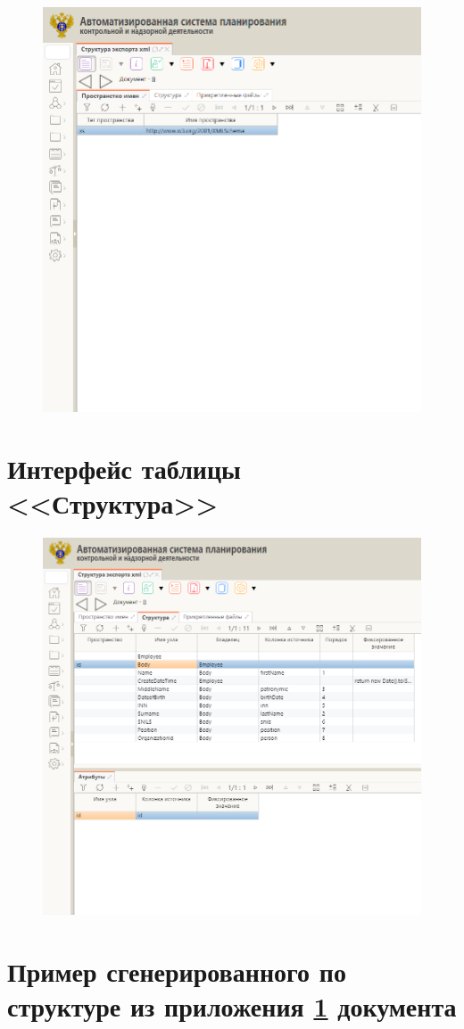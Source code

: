 \documentclass[a4paper,12pt]{diplom}
\begin{document}
\begin{figure}[!ht]
	\centering
	\includegraphics[width=\textwidth]{imgs/Namespaces.png}
	\label{fig:2} %
\end{figure}

\chapter{Интерфейс таблицы <<Структура>>}
\label{D}

\begin{figure}[!ht]
	\centering
	\includegraphics[width=\textwidth]{imgs/struct.png}
	\label{fig:3} %
\end{figure}

\chapter{Пример сгенерированного по структуре из приложения \ref{D} документа}
\label{E}



\end{document}
